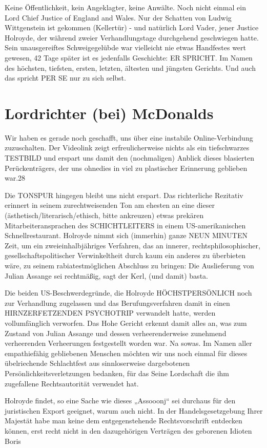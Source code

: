 \begin{multicols}{2}
Keine Öffentlichkeit, kein Angeklagter, keine Anwälte.
Noch nicht einmal ein Lord Chief Justice of England and
Wales. Nur der Schatten von Ludwig Wittgenstein ist gekommen (Kellertür) - und natürlich Lord Vader, jener
Justice Holroyde, der während zweier Verhandlungstage
durchgehend geschwiegen hatte. Sein unausgereiftes
Schweigegelübde war vielleicht nie etwas Handfestes
wert gewesen, 42 Tage später ist es jedenfalls Geschichte:
ER SPRICHT. Im Namen des höchsten, tiefsten, ersten,
letzten, ältesten und jüngsten Gerichts. Und auch das
spricht PER SE nur zu sich selbst.

\section{Lordrichter (bei) McDonalds}

Wir haben es gerade noch geschafft, uns über eine instabile Online-Verbindung zuzuschalten. Der Videolink zeigt erfreulicherweise nichts als ein tiefschwarzes
TESTBILD und erspart uns damit den (nochmaligen)
Anblick dieses blasierten Perückenträgers, der uns ohnedies in viel zu plastischer Erinnerung geblieben war.28

Die TONSPUR hingegen bleibt uns nicht erspart. Das
richterliche Rezitativ erinnert in seinem zurechtweisenden Ton am ehesten an eine dieser (ästhetisch/literarisch/ethisch, bitte ankreuzen) etwas prekären Mitarbeiteransprachen des SCHICHTLEITERS in einem
US-amerikanischen Schnellrestaurant. Holroyde nimmt
sich (immerhin) ganze NEUN MINUTEN Zeit, um ein
zweieinhalbjähriges Verfahren, das an innerer, rechtsphilosophischer, gesellschaftspolitischer Verwinkeltheit
durch kaum ein anderes zu überbieten wäre, zu seinem
rabiatestmöglichen Abschluss zu bringen: Die Auslieferung von Julian Assange sei rechtmäßig, sagt der Kerl,
(und damit) basta.

Die beiden US-Beschwerdegründe, die Holroyde
HÖCHSTPERSÖNLICH noch zur Verhandlung zugelassen und das Berufungsverfahren damit in einen
HIRNZERFETZENDEN PSYCHOTRIP verwandelt hatte,
werden vollumfänglich verworfen. Das Hohe Gericht erkennt damit alles an, was zum Zustand von Julian Assange und dessen verheerenderweise zunehmend verheerenden Verheerungen festgestellt worden war. Na sowas.
Im Namen aller empathiefähig gebliebenen Menschen
möchten wir uns noch einmal für dieses übelriechende
Schlachtfest aus sinnloserweise dargebotenen Persönlichkeitsverletzungen bedanken, für das Seine Lordschaft die ihm zugefallene Rechtsautorität verwendet
hat.

Holroyde findet, so eine Sache wie dieses „Assooonj“
sei durchaus für den juristischen Export geeignet, warum auch nicht. In der Handelsgesetzgebung Ihrer Majestät habe man keine dem entgegenstehende Rechtsvorschrift entdecken können, erst recht nicht in den
dazugehörigen Verträgen des geborenen Idioten Boris


\end{multicols}
